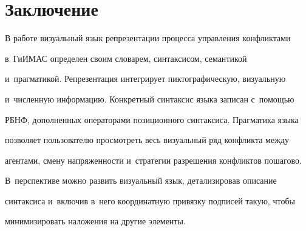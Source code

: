 \vspace*{-7pt}



\section{Заключение}



\vspace*{-3pt}



  В работе визуальный язык репрезентации процесса управления конфликтами 

в~\mbox{ГиИМАС} определен своим словарем, синтаксисом, семантикой 

и~прагматикой. Репрезентация интегрирует пиктографическую, визуальную 

и~численную информацию. Конкретный синтаксис языка записан с~помощью 

РБНФ, дополненных операторами позиционного синтаксиса. Прагматика языка 

позволяет пользователю просмотреть весь визуальный ряд конфликта между 

агентами, смену напряженности и~стратегии разрешения конфликтов пошагово. 

В~перспективе можно развить визуальный язык, детализировав описание 

синтаксиса и~включив в~него координатную привязку подписей такую, чтобы 

минимизировать наложения на другие элементы. 

  

  

  \vspace*{-5pt}

  

  

